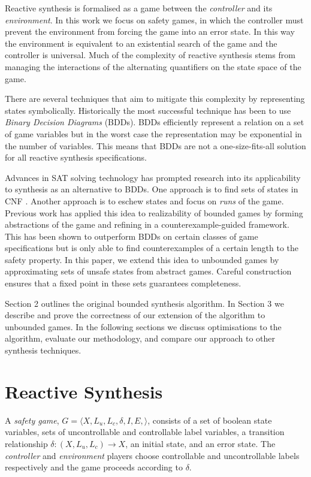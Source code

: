 \documentclass{llncs}
\begin{document}
Reactive synthesis is formalised as a game between the \emph{controller} and
its \emph{environment}. In this work we focus on safety games, in which the
controller must prevent the environment from forcing the game into an error
state. In this way the environment is equivalent to an existential search of
the game and the controller is universal. Much of the complexity of reactive
synthesis stems from managing the interactions of the alternating quantifiers
on the state space of the game.

There are several techniques that aim to mitigate this complexity by
representing states symbolically.  Historically the most successful technique
has been to use \emph{Binary Decision Diagrams} (BDDs).  BDDs efficiently
represent a relation on a set of game variables but in the worst case the
representation may be exponential in the number of variables. This means that
BDDs are not a one-size-fits-all solution for all reactive synthesis
specifications.

Advances in SAT solving technology has prompted research into its applicability
to synthesis as an alternative to BDDs. One approach is to find sets of states
in CNF \cite{bloem2014,morgenstern2013}. Another approach is to eschew states
and focus on \emph{runs} of the game. Previous work has applied this idea to
realizability of bounded games \cite{narodytska2014} by forming abstractions of
the game and refining in a counterexample-guided framework. This has been shown
to outperform BDDs on certain classes of game specifications but is only able
to find counterexamples of a certain length to the safety property.  In this
paper, we extend this idea to unbounded games by approximating sets of unsafe
states from abstract games. Careful construction ensures that a fixed point in
these sets guarantees completeness.

Section 2 outlines the original bounded synthesis algorithm. In Section 3 we
describe and prove the correctness of our extension of the algorithm to
unbounded games. In the following sections we discuss optimisations to the
algorithm, evaluate our methodology, and compare our approach to other
synthesis techniques.

\section{Reactive Synthesis}

A \emph{safety game}, $G = \langle X, L_u, L_c, \delta, I, E, \rangle$,
consists of a set of boolean state variables, sets of uncontrollable and
controllable label variables, a transition relationship $\delta : (X, L_u, L_c)
\to X$, an initial state, and an error state. The \emph{controller} and
\emph{environment} players choose controllable and uncontrollable labels
respectively and the game proceeds according to $\delta$. 
\end{document}
